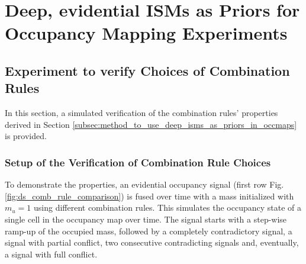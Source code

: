 \chapter{Deep, evidential ISMs as Priors for Occupancy Mapping Experiments}
\label{ch:deep_ev_isms_as_prior_for_occmaps_exp}
%
\section{Experiment to verify Choices of Combination Rules}
\label{sec:exp_choice_comb_rule}
In this section, a simulated verification of the combination rules' properties derived in Section \ref{subsec:method_to_use_deep_isms_as_priors_in_occmaps} is provided.
%
\subsection{Setup of the Verification of Combination Rule Choices}
\label{subsec:setup_choice_comb_rule}
To demonstrate the properties, an evidential occupancy signal (first row Fig. \ref{fig:ds_comb_rule_comparison}) is fused over time with a mass initialized with $m_u = 1$ using different combination rules. This simulates the occupancy state of a single cell in the occupancy map over time. The signal starts with a step-wise ramp-up of the occupied mass, followed by a completely contradictory signal, a signal with partial conflict, two consecutive contradicting signals and, eventually, a signal with full conflict.
%
